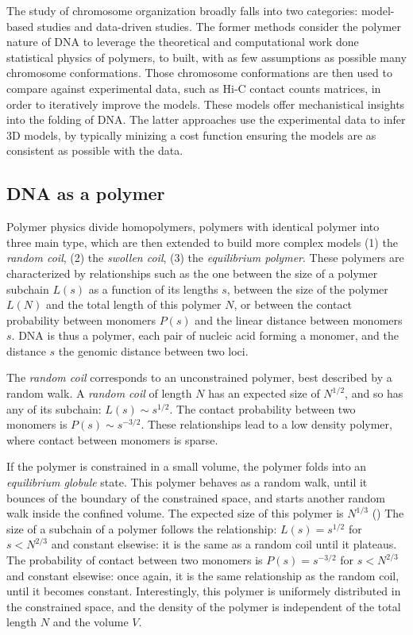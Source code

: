 The study of chromosome organization broadly falls into two categories:
model-based studies and data-driven studies. The former methods consider the
polymer nature of DNA to leverage the theoretical and computational work done
statistical physics of polymers, to built, with as few assumptions as
possible many chromosome conformations. Those chromosome conformations
are then used to compare against experimental data, such as Hi-C contact
counts matrices, in order to iteratively improve the models. These models
offer mechanistical insights into the folding of DNA. The latter approaches
use the experimental data to infer 3D models, by typically minizing a cost
function ensuring the models are as consistent as possible with the data.

\subsection{DNA as a polymer}

Polymer physics divide homopolymers, polymers with identical polymer into
three main type, which are then extended to build more complex models (1) the
\textit{random coil}, (2) the \textit{swollen coil}, (3) the
\textit{equilibrium polymer}. These polymers are characterized by
relationships such as the one between the size of a polymer subchain $L(s)$ as
a function of its lengths $s$, between the size of the polymer $L(N)$ and the
total length of this polymer $N$, or between the contact probability between
monomers $P(s)$ and the linear distance between monomers $s$. DNA is thus a
polymer, each pair of nucleic acid forming a monomer, and the distance $s$ the
genomic distance between two loci.

The \textit{random coil} corresponds to an unconstrained polymer, best
described by a random walk. A \textit{random coil} of length $N$ has an
expected size of $N^{1/2}$, and so has any of its subchain: $L(s) \sim
s^{1/2}$. The contact probability between two monomers is $P(s) \sim
s^{-3/2}$. These relationships lead to a low density polymer, where contact
between monomers is sparse.


If the polymer is constrained in a small volume, the polymer folds into an
\textit{equilibrium globule} state. This polymer behaves as a random walk,
until it bounces of the boundary of the constrained space, and starts another
random walk inside the confined volume. The expected size of this polymer is
$N^{1/3}$ () The size of a subchain of a polymer follows the relationship: $L(s) =
s^{1/2}$ for $s < N^{2/3}$ and constant elsewise: it is the same as a random
coil until it plateaus. The probability of contact between two monomers is
$P(s) = s^{-3/2}$ for $s < N^{2/3}$ and constant elsewise: once again, it is
the same relationship as the random coil, until it becomes constant.
Interestingly, this polymer is uniformely distributed in the constrained
space, and the density of the polymer is independent of the total length $N$
and the volume $V$.

